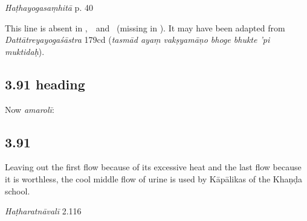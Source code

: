 \begin{ekdosis}

\begin{testimonia}[hp03_090_1]
\emph{Haṭhayogasaṃhitā} p. 40
\begin{versinnote}
\end{versinnote}
\end{testimonia}

\begin{philcomm}[hp03_090_1]
This line is absent in \alphaTwo,\ \alphaThree\ and \gammaOne\ (missing in \alphaOne). It may have been adapted from \emph{Dattātreyayogaśāstra} 179cd (\emph{tasmād ayaṃ vakṣyamāṇo bhoge bhukte ’pi muktidaḥ}). 
\end{philcomm}


\subsection*{3.91 heading}
\begin{translation}[hp03_091a]
Now \emph{amarolī}:
\end{translation}


\subsection*{3.91}
\begin{translation}[hp03_091]
Leaving out the first flow because of its excessive heat and the last flow because it is worthless, the cool middle flow of urine is used by Kāpālikas of the Khaṇḍa school.
\end{translation}

\begin{sources}[hp03_091]
\end{sources}

\begin{testimonia}[hp03_091]
\emph{Haṭharatnāvalī} 2.116
\begin{versinnote}
\tl{\var{vihāya nityāṃ ] pittolbaṇatvāt \vl}\\+}
\tl{\var{anarghyām ] anarghyā}\\!}
\end{versinnote}


\end{testimonia}
\end{ekdosis}
